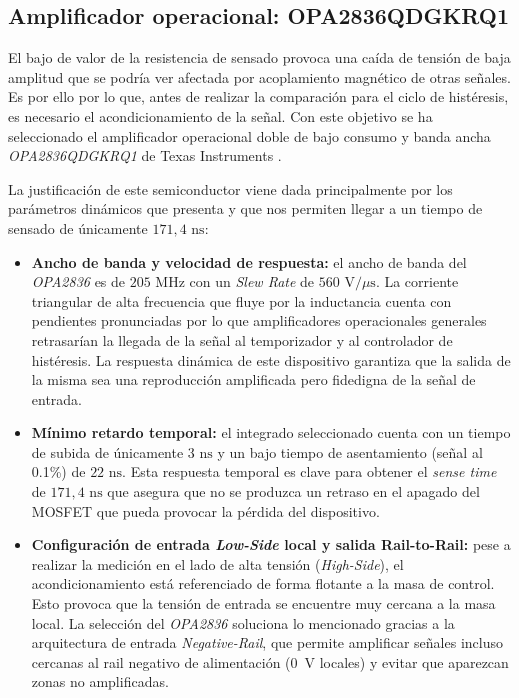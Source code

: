 \documentclass[12pt]{report} %
\begin{document}
\subsection{Amplificador operacional: OPA2836QDGKRQ1}
El bajo de valor de la resistencia de sensado provoca una caída de tensión de baja amplitud que se podría ver afectada por acoplamiento magnético de otras señales. Es por ello por lo que, antes de realizar la comparación para el ciclo de histéresis, es necesario el acondicionamiento de la señal. Con este objetivo se ha seleccionado el amplificador operacional doble de bajo consumo y banda ancha \textit{OPA2836QDGKRQ1} de Texas Instruments \cite{texas_instruments_opa2836qdgkrq1_nodate}. 

La justificación de este semiconductor viene dada principalmente por los parámetros dinámicos que presenta y que nos permiten llegar a un tiempo de sensado de únicamente $171{,}4\text{ ns}$:
\begin{itemize}
    \item \textbf{Ancho de banda y velocidad de respuesta:} el ancho de banda del \textit{OPA2836} es de $205\text{ MHz}$ con un \textit{Slew Rate} de $560\text{ V}/\mu\text{s}$. La corriente triangular de alta frecuencia que fluye por la inductancia cuenta con pendientes pronunciadas por lo que amplificadores operacionales generales retrasarían la llegada de la señal al temporizador y al controlador de histéresis. La respuesta dinámica de este dispositivo garantiza que la salida de la misma sea una reproducción amplificada pero fidedigna de la señal de entrada.
    \item \textbf{Mínimo retardo temporal:} el integrado seleccionado cuenta con un tiempo de subida de únicamente $3\text{ ns}$ y un bajo tiempo de asentamiento (señal al 0.1\%) de $22\text{ ns}$. Esta respuesta temporal es clave para obtener el \textit{sense time} de $171{,}4\text{ ns}$ que asegura que no se produzca un retraso en el apagado del MOSFET que pueda provocar la pérdida del dispositivo.

    \item \textbf{Configuración de entrada \textit{Low-Side} local y salida Rail-to-Rail:} pese a realizar la medición en el lado de alta tensión (\textit{High-Side}), el acondicionamiento está referenciado de forma flotante a la masa de control. Esto provoca que la tensión de entrada se encuentre muy cercana a la masa local. La selección del \textit{OPA2836} soluciona lo mencionado gracias a la arquitectura de entrada \textit{Negative-Rail}, que permite amplificar señales incluso cercanas al rail negativo de alimentación (0~V locales) y evitar que aparezcan zonas no amplificadas. 
\end{itemize}
\end{document}
